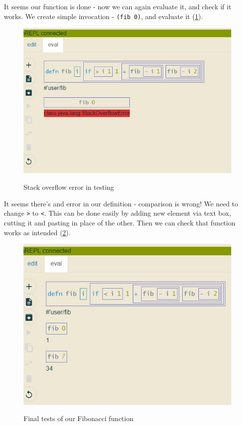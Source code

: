 \documentclass[11pt]{scrartcl}
\begin{document}
It seems our function is done - now we can again evaluate it, and check if it
works. We create simple invocation - \lstinline{(fib 0)}, and evaluate it (\ref{j-fib-err}).

\begin{figure}[hbt]
  \includegraphics[scale=0.3]{img/j-fib-err}
  \label{j-fib-err}
  \caption{Stack overflow error in testing}
\end{figure}

It seems there's and error in our definition - comparison is wrong! We need to
change \lstinline{>} to \lstinline{<}. This can be done easily by adding new
element via text box, cutting it and pasting in place of the other. Then we can
check that function works as intended (\ref{j-fib-works}).

\begin{figure}[hbt]
  \includegraphics[scale=0.3]{img/j-fib-works}
  \label{j-fib-works}
  \caption{Final tests of our Fibonacci function}
\end{figure}
\end{document}
